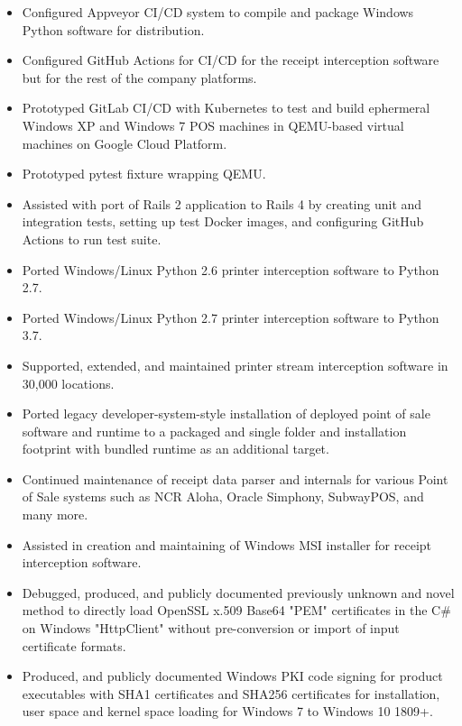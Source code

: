 \documentclass[10pt,letter,ragged2e]{altacv}
\begin{document}
\begin{paracol}{2}


\begin{itemize}
\item Configured Appveyor CI/CD system to compile and package Windows Python software for distribution.
\item Configured GitHub Actions for CI/CD for the receipt interception software but for the rest of the company platforms.
\item Prototyped GitLab CI/CD with Kubernetes to test and build ephermeral Windows XP and Windows 7 POS machines in QEMU-based virtual machines on Google Cloud Platform. 
\item Prototyped pytest fixture wrapping QEMU.
\item Assisted with port of Rails 2 application to Rails 4 by creating unit and integration tests, setting up test Docker images, and configuring GitHub Actions to run test suite.
\item Ported Windows/Linux Python 2.6 printer interception software to Python 2.7.
\item Ported Windows/Linux Python 2.7 printer interception software to Python 3.7.
\item Supported, extended, and maintained printer stream interception software in 30,000 locations.
\item Ported legacy developer-system-style installation of deployed point of sale software and runtime to a packaged and single folder and installation footprint with bundled runtime as an additional target.
\item Continued maintenance of receipt data parser and internals for various Point of Sale systems such as NCR Aloha, Oracle Simphony, SubwayPOS, and many more.
\item Assisted in creation and maintaining of Windows MSI installer for receipt interception software.
\item Debugged, produced, and publicly documented previously unknown and novel method to directly load OpenSSL x.509 Base64 "PEM" certificates in the C\# on Windows "HttpClient" without pre-conversion or import of input certificate formats.
\item Produced, and publicly documented Windows PKI code signing for product executables with SHA1 certificates and SHA256 certificates for installation, user space and kernel space loading for Windows 7 to Windows 10 1809+.

\end{itemize}
\end{paracol}
\end{document}
